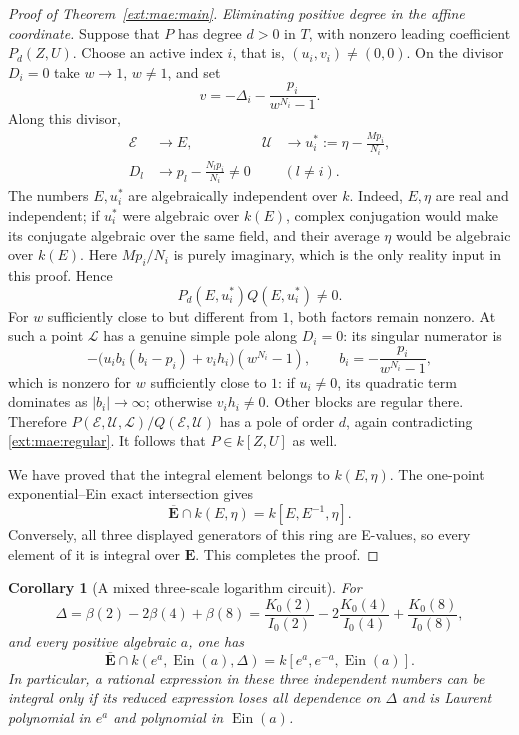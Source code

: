 \documentclass[11pt,a4paper]{article}
\newtheorem{corollary}[theorem]{Corollary}
\theoremstyle{definition}\newtheorem{definition}[theorem]{Definition}
\theoremstyle{remark}\newtheorem{remark}[theorem]{Remark}
\begin{document}
\begin{proof}[Proof of Theorem~\ref{ext:mae:main}]
\emph{Eliminating positive degree in the affine coordinate.}
Suppose that $P$ has degree $d>0$ in $T$, with nonzero leading
coefficient $P_d(Z,U)$.  Choose an active index $i$, that is,
$(u_i,v_i)\ne(0,0)$.  On the divisor
$D_i=0$ take $w\to1$, $w\ne1$, and set
\[
                 v=-\Delta_i-\frac{p_i}{w^{N_i}-1}.
\]
Along this divisor,
\begin{align*}
 \mathcal E&\longrightarrow E,&
 \mathcal U&\longrightarrow u_i^*:=\eta-\frac{Mp_i}{N_i},\\
 D_l&\longrightarrow p_l-\frac{N_lp_i}{N_i}\ne0
           &&(l\ne i).
\end{align*}
The numbers $E,u_i^*$ are algebraically independent over $k$.
Indeed, $E,\eta$ are real and independent; if $u_i^*$ were algebraic
over $k(E)$, complex conjugation would make its conjugate algebraic
over the same field, and their average $\eta$ would be algebraic over
$k(E)$.  Here $Mp_i/N_i$ is purely imaginary, which is the only
reality input in this proof.  Hence
\[
                         P_d(E,u_i^*)Q(E,u_i^*)\ne0.
\]
For $w$ sufficiently close to but different from $1$, both factors
remain nonzero.  At such a point $\mathcal L$ has a genuine simple
pole along $D_i=0$: its singular numerator is
\[
 -\bigl(u_i b_i(b_i-p_i)+v_i h_i\bigr)(w^{N_i}-1),
 \qquad b_i=-\frac{p_i}{w^{N_i}-1},
\]
which is nonzero for $w$ sufficiently close to $1$: if $u_i\ne0$,
its quadratic term dominates as $|b_i|\to\infty$; otherwise
$v_i h_i\ne0$.
Other blocks are regular there.  Therefore
$P(\mathcal E,\mathcal U,\mathcal L)/Q(\mathcal E,\mathcal U)$
has a pole of order $d$, again contradicting \eqref{ext:mae:regular}.
It follows that $P\in k[Z,U]$ as well.

We have proved that the integral element belongs to $k(E,\eta)$.
The one-point exponential--Ein exact intersection gives
\[
              \overline{\mathbf E}\cap k(E,\eta)
                              =k[E,E^{-1},\eta].
\]
Conversely, all three displayed generators of this ring are E-values,
so every element of it is integral over $\mathbf E$.  This completes
the proof.
\end{proof}

\begin{corollary}[A mixed three-scale logarithm circuit]\label{ext:mae:circuit}
For
\[
 \Delta=\beta(2)-2\beta(4)+\beta(8)
 =\frac{K_0(2)}{I_0(2)}-2\frac{K_0(4)}{I_0(4)}
                         +\frac{K_0(8)}{I_0(8)},
\]
and every positive algebraic $a$, one has
\[
 \overline{\mathbf E}\cap k(e^a,\operatorname{Ein}(a),\Delta)
                      =k[e^a,e^{-a},\operatorname{Ein}(a)].
\]
In particular, a rational expression in these three independent
numbers can be integral only if its reduced expression loses all
dependence on $\Delta$ and is Laurent polynomial in $e^a$ and
polynomial in $\operatorname{Ein}(a)$.
\end{corollary}
\end{document}

